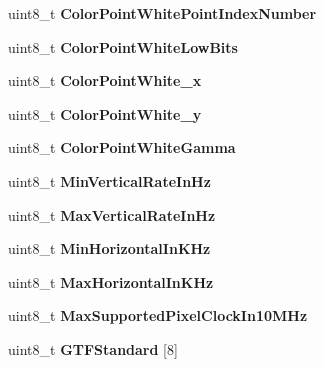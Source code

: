 \begin{DoxyCompactItemize}
uint8\+\_\+t {\bfseries Color\+Point\+White\+Point\+Index\+Number}
\item 
\mbox{\label{structRTEMS__PACKED_a1af20db4059892e3685c32bed43eca6e}} 
uint8\+\_\+t {\bfseries Color\+Point\+White\+Low\+Bits}
\item 
\mbox{\label{structRTEMS__PACKED_a859ef64e568d856b97ea74156ae19757}} 
uint8\+\_\+t {\bfseries Color\+Point\+White\+\_\+x}
\item 
\mbox{\label{structRTEMS__PACKED_a2f61944d1b4127224a7427688bc1a3a7}} 
uint8\+\_\+t {\bfseries Color\+Point\+White\+\_\+y}
\item 
\mbox{\label{structRTEMS__PACKED_ac0170e41bc44f859946f48535b4e236a}} 
uint8\+\_\+t {\bfseries Color\+Point\+White\+Gamma}
\item 
\mbox{\label{structRTEMS__PACKED_a56f5724a6657d7dc3fb8756ad7616a9d}} 
uint8\+\_\+t {\bfseries Min\+Vertical\+Rate\+In\+Hz}
\item 
\mbox{\label{structRTEMS__PACKED_ae90e6e500fd093c608aa0279e208247f}} 
uint8\+\_\+t {\bfseries Max\+Vertical\+Rate\+In\+Hz}
\item 
\mbox{\label{structRTEMS__PACKED_ac27439e750901eb40971dec70bada4e5}} 
uint8\+\_\+t {\bfseries Min\+Horizontal\+In\+K\+Hz}
\item 
\mbox{\label{structRTEMS__PACKED_aaed8eb0e7f463e7e17e5c7daa427f679}} 
uint8\+\_\+t {\bfseries Max\+Horizontal\+In\+K\+Hz}
\item 
\mbox{\label{structRTEMS__PACKED_a58200eec4d7717c886ecfb6749e98503}} 
uint8\+\_\+t {\bfseries Max\+Supported\+Pixel\+Clock\+In10\+M\+Hz}
\item 
\mbox{\label{structRTEMS__PACKED_a79e9432494efaea14b83ac311418c75c}} 
uint8\+\_\+t {\bfseries G\+T\+F\+Standard} \mbox{[}8\mbox{]}
\item 
\mbox{\label{structRTEMS__PACKED_af50f8a922625e755f2e7a44bc1fee063}} 

\end{DoxyCompactItemize}
